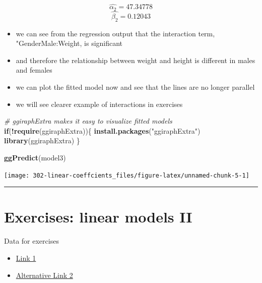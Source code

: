 \documentclass[
]{book}
\newenvironment{Shaded}{\begin{snugshade}}{\end{snugshade}}
\newcommand{\CommentTok}[1]{\textcolor[rgb]{0.56,0.35,0.01}{\textit{#1}}}
\newcommand{\ControlFlowTok}[1]{\textcolor[rgb]{0.13,0.29,0.53}{\textbf{#1}}}
\newcommand{\KeywordTok}[1]{\textcolor[rgb]{0.13,0.29,0.53}{\textbf{#1}}}
\newcommand{\NormalTok}[1]{#1}
\newcommand{\OperatorTok}[1]{\textcolor[rgb]{0.81,0.36,0.00}{\textbf{#1}}}
\newcommand{\StringTok}[1]{\textcolor[rgb]{0.31,0.60,0.02}{#1}}
\providecommand{\tightlist}{%
  \setlength{\itemsep}{0pt}\setlength{\parskip}{0pt}}
\theoremstyle{definition}
\theoremstyle{definition}
\theoremstyle{definition}
\theoremstyle{remark}
\begin{document}
\[\hat{\alpha_2} = 47.34778\]
\[\hat{\beta_2} = 0.12043\]

\begin{itemize}
\tightlist
\item
  we can see from the regression output that the interaction term, "GenderMale:Weight, is significant
\item
  and therefore the relationship between weight and height is different in males and females
\item
  we can plot the fitted model now and see that the lines are no longer parallel
\item
  we will see clearer example of interactions in exercises
\end{itemize}

\begin{Shaded}
\begin{Highlighting}[]
\CommentTok{\# ggiraphExtra makes it easy to visualize fitted models}
\ControlFlowTok{if}\NormalTok{(}\OperatorTok{!}\KeywordTok{require}\NormalTok{(ggiraphExtra))\{}
    \KeywordTok{install.packages}\NormalTok{(}\StringTok{"ggiraphExtra"}\NormalTok{)}
    \KeywordTok{library}\NormalTok{(ggiraphExtra)}
\NormalTok{\}}

\KeywordTok{ggPredict}\NormalTok{(model3)}
\end{Highlighting}
\end{Shaded}

\begin{center}\texttt{[image: 302-linear-coeffcients\_files/figure-latex/unnamed-chunk-5-1]} \end{center}

\begin{center}\rule{0.5\linewidth}{0.5pt}\end{center}

\hypertarget{exercises-linear-models-ii}{%
\section{Exercises: linear models II}\label{exercises-linear-models-ii}}

Data for exercises

\begin{itemize}
\tightlist
\item
  \href{https://github.com/olgadet/bookdown-mlbiostatistics/tree/master/data/data.zip}{Link 1}
\item
  \href{https://stockholmuniversity.box.com/s/z5kwg0nlwe5la4h5t8bshpj57pylif14}{Alternative Link 2}
\end{itemize}
\end{document}
